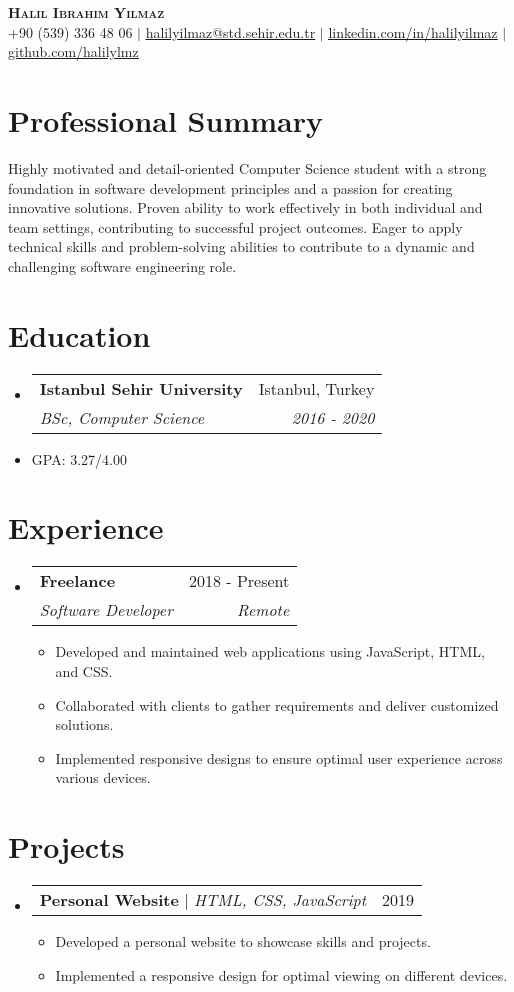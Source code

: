 \documentclass[letterpaper,11pt]{article}
\makeatletter
\newcommand{\resumeItem}[1]{
\item\small{
{#1 \vspace{-2pt}}
}
}
\newcommand{\resumeSubheading}[4]{
\vspace{-2pt}\item
\begin{tabular*}{0.97\textwidth}[t]{l@{\extracolsep{\fill}}r}
\textbf{#1} & #2 \\
\textit{\small#3} & \textit{\small #4} \\
\end{tabular*}\vspace{-7pt}
}
\newcommand{\resumeProjectHeading}[2]{
\item
\begin{tabular*}{0.97\textwidth}{l@{\extracolsep{\fill}}r}
\small#1 & #2 \\
\end{tabular*}\vspace{-7pt}
}
\newcommand{\resumeSubItem}[1]{\resumeItem{#1}\vspace{-4pt}}
\newcommand{\resumeSubHeadingListStart}{\begin{itemize}[leftmargin=0.15in, label={}]}
\newcommand{\resumeSubHeadingListEnd}{\end{itemize}}
\newcommand{\resumeItemListStart}{\begin{itemize}}
\newcommand{\resumeItemListEnd}{\end{itemize}\vspace{-5pt}}
\makeatother
\begin{document}
\begin{center}
\textbf{\Huge \scshape Halil Ibrahim Yilmaz} \\ \vspace{1pt}
\small +90 (539) 336 48 06 $|$ \href{mailto:halilyilmaz@std.sehir.edu.tr}{\underline{halilyilmaz@std.sehir.edu.tr}} $|$
\href{https://www.linkedin.com/in/halilyilmaz}{\underline{linkedin.com/in/halilyilmaz}} $|$
\href{https://github.com/halilylmz}{\underline{github.com/halilylmz}}
\end{center}


\section{Professional Summary} %
Highly motivated and detail-oriented Computer Science student with a strong foundation in software development principles and a passion for creating innovative solutions. Proven ability to work effectively in both individual and team settings, contributing to successful project outcomes. Eager to apply technical skills and problem-solving abilities to contribute to a dynamic and challenging software engineering role.

\section{Education}
\resumeSubHeadingListStart
\resumeSubheading{Istanbul Sehir University}{Istanbul, Turkey}{BSc, Computer Science}{2016 - 2020}
\resumeSubItem{GPA: 3.27/4.00}
\resumeSubHeadingListEnd

\section{Experience}
\resumeSubHeadingListStart
\resumeSubheading{Freelance}{2018 - Present}{Software Developer}{Remote}
\resumeItemListStart
\resumeItem{Developed and maintained web applications using JavaScript, HTML, and CSS.}
\resumeItem{Collaborated with clients to gather requirements and deliver customized solutions.}
\resumeItem{Implemented responsive designs to ensure optimal user experience across various devices.}
\resumeItemListEnd
\resumeSubHeadingListEnd

\section{Projects}
\resumeSubHeadingListStart
\resumeProjectHeading{\textbf{Personal Website} $|$ \emph{HTML, CSS, JavaScript}}{2019}
\resumeItemListStart
\resumeItem{Developed a personal website to showcase skills and projects.}
\resumeItem{Implemented a responsive design for optimal viewing on different devices.}
\resumeItemListEnd
\resumeSubHeadingListEnd
\end{document}
